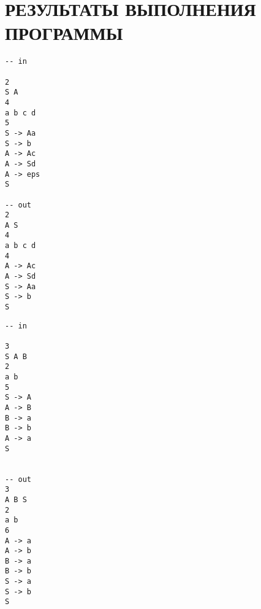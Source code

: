 \chapter*{РЕЗУЛЬТАТЫ ВЫПОЛНЕНИЯ ПРОГРАММЫ}

\begin{lstlisting}[caption={Устранение левой рекурсии}]
-- in

2
S A
4
a b c d
5
S -> Aa
S -> b
A -> Ac
A -> Sd
A -> eps
S

-- out
2
A S
4
a b c d
4
A -> Ac
A -> Sd
S -> Aa
S -> b
S
\end{lstlisting}

\begin{lstlisting}[caption={Устранение цепных правил}]
-- in
	
3
S A B
2
a b
5
S -> A
A -> B
B -> a
B -> b
A -> a
S

	
-- out
3
A B S
2
a b
6
A -> a
A -> b
B -> a
B -> b
S -> a
S -> b
S
\end{lstlisting}
